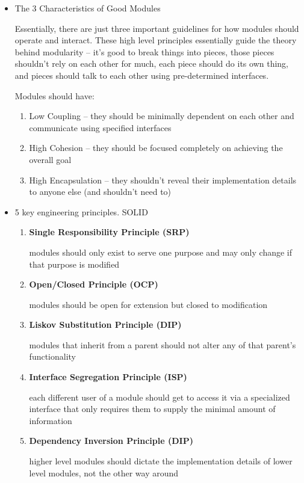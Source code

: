 \documentclass[11pt]{article}
\begin{document}
\begin{itemize}
\item The 3 Characteristics of Good Modules

Essentially, there are just three important guidelines for how modules 
should operate and interact. These high level principles essentially guide
the theory behind modularity -- it's good to break things into pieces, 
those pieces shouldn't rely on each other for much, each piece should do 
its own thing, and pieces should talk to each other using pre-determined
interfaces.

Modules should have:

\begin{enumerate}
\item Low Coupling -- they should be minimally dependent on each other and 
communicate using specified interfaces

\item High Cohesion -- they should be focused completely on achieving the 
overall goal

\item High Encapsulation -- they shouldn't reveal their implementation 
details to anyone else (and shouldn't need to)
\end{enumerate}

\item 5 key engineering principles. SOLID

\begin{enumerate}
\item \textbf{Single Responsibility Principle (SRP)} 

modules should only exist to serve one purpose and may only change if 
that purpose is modified

\item \textbf{Open/Closed Principle (OCP)}

modules should be open for extension but closed to modification

\item \textbf{Liskov Substitution Principle (DIP)}

modules that inherit from a parent should not alter any of that 
parent's functionality

\item \textbf{Interface Segregation Principle (ISP)}

each different user of a module should get to access it via a 
specialized interface that only requires them to supply the minimal 
amount of information

\item \textbf{Dependency Inversion Principle (DIP)}

higher level modules should dictate the implementation details of lower
level modules, not the other way around
\end{enumerate}
\end{itemize}
\end{document}
